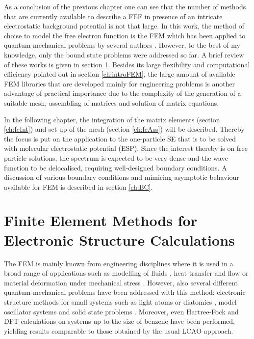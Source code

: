 \label{ch:fem}
As a conclusion of the previous chapter one can see that the number of methods that are currently available to describe a FEF in presence of an intricate electrostatic background potential is not that large.
In this work, the method of choise to model the free electron function is the FEM which has been applied to quantum-mechanical problems by several authors \cite{fem_hydro, vib_fem, fe_hf, fe_dft1}.
However, to the best of my knowledge, only the bound state problems were addressed so far.
A brief review of these works is given in section \ref{ch:feQM}.
Besides its large flexibility and computational efficiency pointed out in section \ref{ch:introFEM}, the large amount of available FEM libraries \cite{libmesh,dealII,freefem, hermes,oofem} that are developed mainly for engineering problems is another advantage of practical importance due to the complexity of the generation of a suitable mesh, assembling of matrices and solution of matrix equations.

In the following chapter, the integration of the matrix elements (section \ref{ch:feInt}) and set up of the mesh (section \ref{ch:feAss}) will be described.
Thereby the focus is put on the application to the one-particle SE that is to be solved with molecular electrostatic potential (ESP).
Since the interest thereby is on free particle solutions, the spectrum is expected to be very dense and the wave function to be delocalised, requiring well-designed boundary conditions.
A discussion of various boundary conditions and mimicing asymptotic behaviour available for FEM is described in section \ref{ch:BC}.

\section{Finite Element Methods for Electronic Structure Calculations}
\label{ch:feQM}
The FEM is mainly known from engineering disciplines where it is used in a broad range of applications such as modelling of fluids \cite{fluid1,fluid2}, heat transfer and flow \cite{heat1, heat2,heat3} or material deformation under mechanical stress \cite{deform1, deform2}.
However, also several different quantum-mechanical problems have been addressed with this method: electronic structure methods for small systems such as light atoms \cite{fem_hydro,fem_He,fem_He1, fem_h1, LiGS_fem} or diatomics \cite{fem_H_refine}, model oscillator systems \cite{vib_fem} and solid state problems \cite{fem_crystal, fem_crystal1}.
Moreover, even Hartree-Fock \cite{fe_hf} and DFT calculations on systems up to the size of benzene \cite{fe_dft1, fe_dft2, fe_dft3} have been performed, yielding results comparable to those obtained by the usual LCAO approach.

